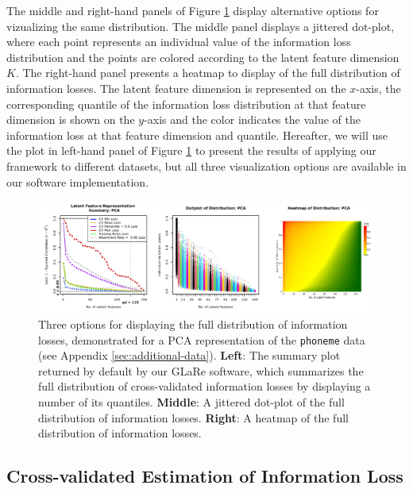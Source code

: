 The middle and right-hand panels of Figure \ref{fig:viz-options} display alternative options for vizualizing the same distribution.
The middle panel displays a jittered dot-plot, where each point represents an individual value of the information loss distribution and the points are colored according to the latent feature dimension $K$.
The right-hand panel presents a heatmap to display of the full distribution of information losses.
The latent feature dimension is represented on the $x$-axis, the corresponding quantile of the information loss distribution at that feature dimension is shown on the $y$-axis and the color indicates the value of the information loss at that feature dimension and quantile.
Hereafter, we will use the plot in left-hand panel of Figure \ref{fig:viz-options} to present the results of applying our framework to different datasets, but all three visualization options are available in our software implementation.


\begin{figure}
    \centering
    \includegraphics[width=1\linewidth]{figures/dist-summaries.pdf}
    \caption{Three options for displaying the full distribution of information losses, demonstrated for a PCA representation of the \texttt{phoneme} data (see Appendix \ref{sec:additional-data}).
    \textbf{Left}: The summary plot returned by default by our GLaRe software, which summarizes the full distribution of cross-validated information losses by displaying a number of its quantiles.
    \textbf{Middle}: A jittered dot-plot of the full distribution of information losses.
    \textbf{Right}: A heatmap of the full distribution of information losses.
    }
    \label{fig:viz-options}
\end{figure}

\subsection{Cross-validated Estimation of Information Loss}

